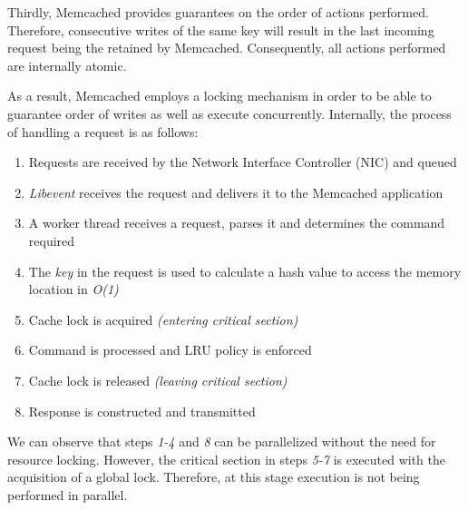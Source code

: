 Thirdly, Memcached provides guarantees on the order of actions performed. Therefore, consecutive writes of the same key will result in the last incoming request being the retained by Memcached. Consequently, all actions performed are internally atomic.

As a result, Memcached employs a locking mechanism in order to be able to guarantee order of writes as well as execute concurrently. Internally, the process of handling a request is as follows:

\begin{enumerate}
    \item Requests are received by the Network Interface Controller (NIC) and queued
    \item \emph{Libevent} receives the request and delivers it to the Memcached application
    \item A worker thread receives a request, parses it and determines the command required
    \item The \emph{key} in the request is used to calculate a hash value to access the memory location in \emph{O(1)}
    \item Cache lock is acquired \emph{(entering critical section)}
    \item Command is processed and LRU policy is enforced
    \item Cache lock is released \emph{(leaving critical section)}
    \item Response is constructed and transmitted \cite{wiggins2012enhancing}
\end{enumerate}

We can observe that steps \textit{1-4} and \textit{8} can be parallelized without the need for resource locking. However, the critical section in steps \textit{5-7} is executed with the acquisition of a global lock. Therefore, at this stage execution is not being performed in parallel.


